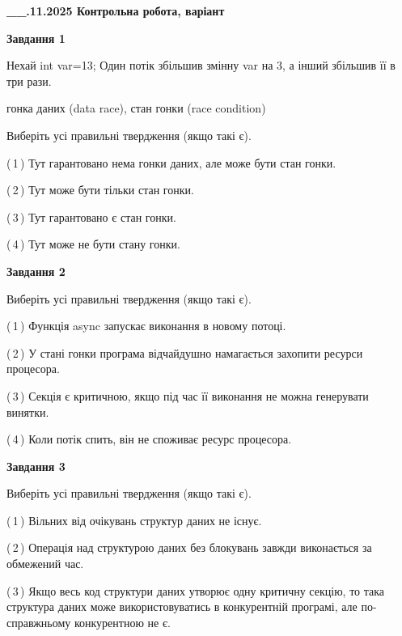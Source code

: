 \documentclass[12pt, ukrainian]{article}
\begin{document}
\begin {large}

\textbf{\_\_.11.2025 Контрольна робота, варіант  }\par


{

\begin{center}
\textbf{Завдання 1}
\end{center}
Нехай int var=13; Один потік збільшив змінну var на 3, а інший збільшив її в три рази.

гонка даних (data race), стан гонки (race condition)

Виберіть усі правильні твердження (якщо такі є).\par
\vspace{2mm}
(\,1\,) Тут гарантовано нема гонки даних, але може бути стан гонки.%

(\,2\,) Тут може бути тільки стан гонки.%

(\,3\,) Тут гарантовано є стан гонки.%

(\,4\,) Тут може не бути стану гонки.%



\begin{center}
\textbf{Завдання 2}
\end{center}
Виберіть усі правильні твердження (якщо такі є).\par
\vspace{2mm}

(\,1\,) Функція async запускає виконання в новому потоці.%

(\,2\,) У стані гонки програма відчайдушно намагається захопити ресурси процесора.%

(\,3\,) Секція є критичною, якщо під час її виконання не можна генерувати винятки.%

(\,4\,) Коли потік спить, він не споживає ресурс процесора.%



\begin{center}
\textbf{Завдання 3}
\end{center}
Виберіть усі правильні твердження (якщо такі є).\par
\vspace{2mm}

(\,1\,) Вільних від очікувань структур даних не існує.%

(\,2\,) Операція над структурою даних без блокувань завжди виконається за обмежений час.%

(\,3\,) Якщо весь код структури даних утворює одну критичну секцію, то така структура даних може використовуватись в конкурентній програмі, але по-справжньо\-му конкурентною не є.%

}
\end{large}
\end{document}
